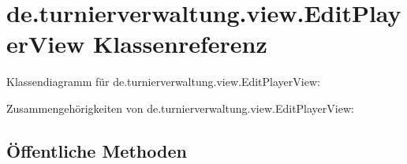 \hypertarget{classde_1_1turnierverwaltung_1_1view_1_1_edit_player_view}{}\section{de.\+turnierverwaltung.\+view.\+Edit\+Player\+View Klassenreferenz}
\label{classde_1_1turnierverwaltung_1_1view_1_1_edit_player_view}


Klassendiagramm für de.\+turnierverwaltung.\+view.\+Edit\+Player\+View\+:


Zusammengehörigkeiten von de.\+turnierverwaltung.\+view.\+Edit\+Player\+View\+:
\subsection*{Öffentliche Methoden}
